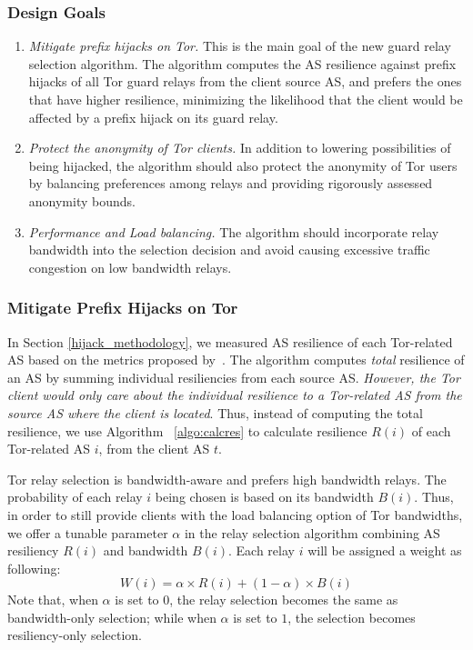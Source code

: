 \subsubsection{Design Goals}
\begin{enumerate}
\item \emph{Mitigate prefix hijacks on Tor.} This is the main goal of the new guard relay selection algorithm. The algorithm computes the AS resilience against prefix hijacks of all Tor guard relays from the client source AS, and prefers the ones that have higher resilience, minimizing the likelihood that the client would be affected by a prefix hijack on its guard relay. 
\item \emph{Protect the anonymity of Tor clients.} In addition to lowering possibilities of being hijacked, the algorithm should also protect the anonymity of Tor users by balancing preferences among relays and providing rigorously assessed anonymity bounds. 
\item \emph{Performance and Load balancing.} The algorithm should incorporate relay bandwidth into the selection decision and avoid causing excessive traffic congestion on low bandwidth relays.
\end{enumerate}

\subsubsection{Mitigate Prefix Hijacks on Tor}

In Section \ref{hijack_methodology}, we measured AS resilience of each Tor-related AS based on the metrics proposed by~\cite{lad2007understanding}. The algorithm computes \emph{total} resilience of an AS by summing individual resiliencies from each source AS. \emph{However, the Tor client would only care about the individual resilience to a Tor-related AS from the source AS where the client is located}. Thus, instead of computing the total resilience, we use Algorithm ~\ref{algo:calcres} to calculate resilience $R(i)$ of each Tor-related AS $i$, from the client AS $t$. 

Tor relay selection is bandwidth-aware and prefers high bandwidth relays. The probability of each relay $i$ being chosen is based on its bandwidth $B(i)$. Thus, in order to still provide clients with the load balancing option of Tor bandwidths, we offer a tunable parameter $\alpha$ in the relay selection algorithm combining AS resiliency $R(i)$ and bandwidth $B(i)$. Each relay $i$ will be assigned a weight as following:
\begin{equation*}
W(i) = \alpha \times R(i) + (1 - \alpha) \times B(i)
\end{equation*}
Note that, when $\alpha$ is set to $0$, the relay selection becomes the same as bandwidth-only selection; while when $\alpha$ is set to $1$, the selection becomes resiliency-only selection. 

